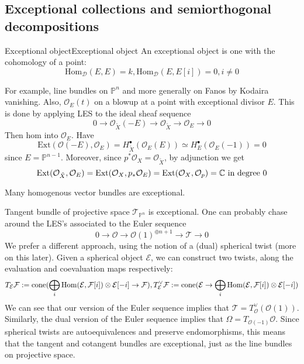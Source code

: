 
\subsection{Exceptional collections and semiorthogonal decompositions}

\begin{definition}{Exceptional object}{Exceptional object}
    An exceptional object is one with the cohomology of a point: $$\mathrm{Hom}_{\mathcal{D}}(E,E)=k, \mathrm{Hom}_{\mathcal{D}}(E,E[i])=0, i\neq 0$$
\end{definition}


For example, line bundles on $\mathbb{P}^n$ and more generally on Fanos by Kodaira vanishing. Also, $\mathcal{O}_{E}(t)$ on a blowup at a point with exceptional divisor $E$. This is done by applying LES to the ideal sheaf sequence $$0\xrightarrow{}\mathcal{O}_{\tilde{X}} (-E)\xrightarrow{}\mathcal{O}_{\tilde{X}}\xrightarrow{}\mathcal{O}_{E}\xrightarrow{}0$$Then hom into $\mathcal{O}_{E}$. Have $$\mathrm{Ext}(\mathcal{O}(-E), \mathcal{O}_{E})=H^\bullet_{\tilde{ X}} (\mathcal{O}_{E}(E))\simeq H^\bullet_{E} (\mathcal{O}_{E}(-1))=0$$since $E=\mathbb{P}^{n-1}$. Moreover, since $p^*\mathcal{O}_{X}=\mathcal{O}_{\tilde{X}}$, by adjunction we get $$\operatorname{Ext}(\mathcal{O}_{\tilde{X}}, \mathcal{O}_E)=\operatorname{Ext}(\mathcal{O}_X, p_*\mathcal{O}_E)=\operatorname{Ext}(\mathcal{O}_X, \mathcal{O}_p)=\mathbb{C} \text{ in degree }0$$

Many homogenous vector bundles are exceptional.

\begin{example}{Tangent bundle of projective space}{} 
    $\mathcal{T}_{\mathbb{P}^n}$ is exceptional. One can probably chase around the LES's associated to the Euler sequence $$0\rightarrow \mathcal{O}\rightarrow \mathcal{O}(1)^{\oplus n+1}\rightarrow \mathcal{T}\rightarrow 0$$
    We prefer a different approach, using the notion of a (dual) spherical twist (more on this later). Given a spherical object $\mathcal{E}$, we can construct two twists, along the evaluation and coevaluation maps respectively: $$T_\mathcal{E}\mathcal{F}:=\mathrm{cone}(\bigoplus_i \operatorname{Hom}(\mathcal{E},\mathcal{F}[i])\otimes \mathcal{E}[-i]\rightarrow \mathcal{F}), T^\lor_\mathcal{E}\mathcal{F}:=\mathrm{cone}(\mathcal{E}\rightarrow \bigoplus_i \operatorname{Hom}(\mathcal{E},\mathcal{F}[i])\otimes \mathcal{E}[-i] )$$
    We can see that our version of the Euler sequence implies that $\mathcal{T}=T^\lor_\mathcal{O}(\mathcal{O}(1))$. Similarly, the dual version of the Euler sequence implies that $\Omega=T_{\mathcal{O}(-1)}\mathcal{O}$. Since spherical twists are autoequivalences and preserve endomorphisms, this means that the tangent and cotangent bundles are exceptional, just as the line bundles on projective space.
\end{example}

